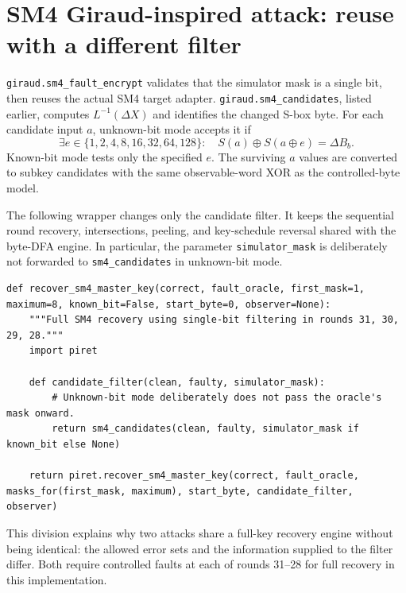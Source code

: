 \documentclass[11pt,a4paper]{report}
\newcommand{\xor}{\mathbin{\oplus}}
\begin{document}
\section{SM4 Giraud-inspired attack: reuse with a different filter}
\texttt{giraud.sm4\_fault\_encrypt} validates that the simulator mask is a single bit, then reuses the actual SM4 target adapter. \texttt{giraud.sm4\_candidates}, listed earlier, computes $L^{-1}(\Delta X)$ and identifies the changed S-box byte. For each candidate input $a$, unknown-bit mode accepts it if
\[
\exists e\in\{1,2,4,8,16,32,64,128\}:\quad S(a)\xor S(a\xor e)=\Delta B_b.
\]
Known-bit mode tests only the specified $e$. The surviving $a$ values are converted to subkey candidates with the same observable-word XOR as the controlled-byte model.

The following wrapper changes only the candidate filter. It keeps the sequential round recovery, intersections, peeling, and key-schedule reversal shared with the byte-DFA engine. In particular, the parameter \texttt{simulator\_mask} is deliberately not forwarded to \texttt{sm4\_candidates} in unknown-bit mode.
\begin{lstlisting}[style=pycode,caption={Giraud-inspired SM4 wrapper with explicit mask knowledge}]
def recover_sm4_master_key(correct, fault_oracle, first_mask=1, maximum=8, known_bit=False, start_byte=0, observer=None):
    """Full SM4 recovery using single-bit filtering in rounds 31, 30, 29, 28."""
    import piret

    def candidate_filter(clean, faulty, simulator_mask):
        # Unknown-bit mode deliberately does not pass the oracle's mask onward.
        return sm4_candidates(clean, faulty, simulator_mask if known_bit else None)

    return piret.recover_sm4_master_key(correct, fault_oracle, masks_for(first_mask, maximum), start_byte, candidate_filter, observer)
\end{lstlisting}

This division explains why two attacks share a full-key recovery engine without being identical: the allowed error sets and the information supplied to the filter differ. Both require controlled faults at each of rounds 31--28 for full recovery in this implementation.
\end{document}
